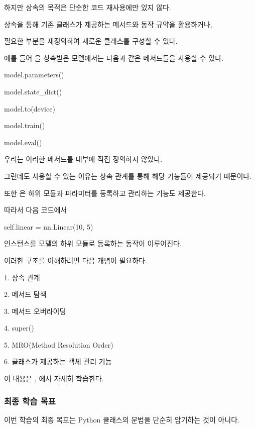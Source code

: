 하지만 상속의 목적은 단순한 코드 재사용에만 있지 않다.

상속을 통해 기존 클래스가 제공하는 메서드와 동작 규약을 활용하거나,

필요한 부분을 재정의하여 새로운 클래스를 구성할 수 있다.

예를 들어 을 상속받은 모델에서는 다음과 같은 메서드들을 사용할 수 있다.

\begin{dhkcode}
model.parameters()

model.state_dict()

model.to(device)

model.train()

model.eval()
\end{dhkcode}

우리는 이러한 메서드를  내부에 직접 정의하지 않았다.

그런데도 사용할 수 있는 이유는 상속 관계를 통해 해당 기능들이 제공되기 때문이다.

또한 은 하위 모듈과 파라미터를 등록하고 관리하는 기능도 제공한다.

따라서 다음 코드에서

\begin{dhkcode}
self.linear = nn.Linear(10, 5)
\end{dhkcode}

 인스턴스를 모델의 하위 모듈로 등록하는 동작이 이루어진다.

이러한 구조를 이해하려면 다음 개념이 필요하다.

\begin{dhksmry}
    1. 상속 관계

    2. 메서드 탐색

    3. 메서드 오버라이딩

    4. super()

    5. MRO(Method Resolution Order)

    6. 클래스가 제공하는 객체 관리 기능
\end{dhksmry}

이 내용은 , 에서 자세히 학습한다.

\subsubsection{최종 학습 목표}

이번 학습의 최종 목표는 Python 클래스의 문법을 단순히 암기하는 것이 아니다.

